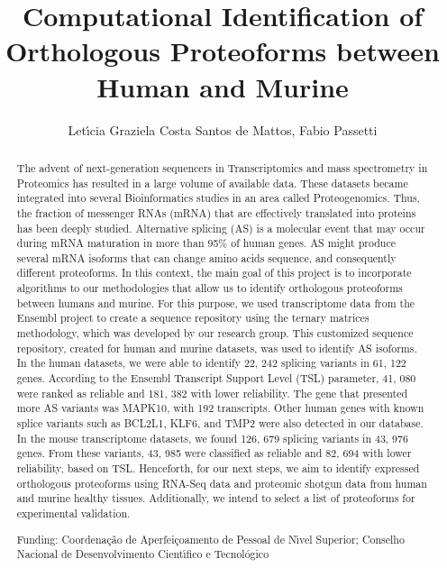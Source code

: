 \documentclass[twoside]{article}
\title{\vspace{-15mm}\fontsize{24pt}{10pt}\selectfont\textbf{ Computational Identification of Orthologous Proteoforms between Human and Murine }} %
\author{ Let\'{\i}cia Graziela Costa Santos de Mattos, Fabio Passetti }
\affil{ Laboratory of Gene Expression Regulation,  Carlos Chagas Institute,  Funda\c{c}\~ao Oswaldo Cruz (Fiocruz),  Curitiba,  PR,  Brazil }
\date{}
\begin{document}
  
  
  \maketitle %
  
  
  \thispagestyle{fancy} %
  
  
  \begin{abstract}
  The advent of next-generation sequencers in Transcriptomics and mass spectrometry in Proteomics has resulted in a large volume of available data. These datasets became integrated into several Bioinformatics studies in an area called Proteogenomics. Thus,  the fraction of messenger RNAs (mRNA) that are effectively translated into proteins has been deeply studied. Alternative splicing (AS) is a molecular event that may occur during mRNA maturation in more than 95\% of human genes. AS might produce several mRNA isoforms that can change amino acids sequence,  and consequently different proteoforms. In this context,  the main goal of this project is to incorporate algorithms to our methodologies that allow us to identify orthologous proteoforms between humans and murine. For this purpose,  we used transcriptome data from the Ensembl project to create a sequence repository using the ternary matrices methodology,  which was developed by our research group. This customized sequence repository,  created for human and murine datasets,  was used to identify AS isoforms. In the human datasets,  we were able to identify 22, 242 splicing variants in 61, 122 genes. According to the Ensembl Transcript Support Level (TSL) parameter,  41, 080 were ranked as reliable and 181, 382 with lower reliability. The gene that presented more AS variants was MAPK10,  with 192 transcripts. Other human genes with known splice variants such as BCL2L1,  KLF6,  and TMP2 were also detected in our database. In the mouse transcriptome datasets,  we found 126, 679 splicing variants in 43, 976 genes. From these variants,  43, 985 were classified as reliable and 82, 694 with lower reliability,  based on TSL. Henceforth,  for our next steps,  we aim to identify expressed orthologous proteoforms using RNA-Seq data and proteomic shotgun data from human and murine healthy tissues. Additionally,  we intend to select a list of proteoforms for experimental validation.
  
  Funding: Coordena\c{c}\~ao de Aperfei\c{c}oamento de Pessoal de N\'{\i}vel Superior; Conselho Nacional de Desenvolvimento Cient\'{\i}fico e Tecnol\'ogico \\ 
  \end{abstract}
  
\end{document}
